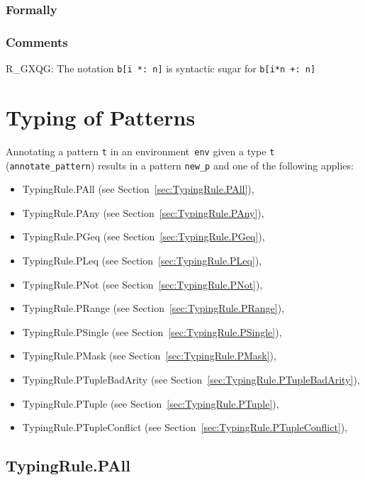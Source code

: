 \documentclass{book}
\begin{document}
\begin{emptyformal}
    \subsection{Formally}
\end{emptyformal}

\subsection{Comments}
    R\_GXQG: The notation \texttt{b[i *: n]} is syntactic sugar for \texttt{b[i*n +: n]}

\chapter{Typing of Patterns}

Annotating a pattern \texttt{t} in an environment~\texttt{env} given a type \texttt{t} (\texttt{annotate\_pattern}) results in a pattern \texttt{new\_p} and one of the following applies:
\begin{itemize}
\item TypingRule.PAll (see Section~\ref{sec:TypingRule.PAll}),
\item TypingRule.PAny (see Section~\ref{sec:TypingRule.PAny}),
\item TypingRule.PGeq (see Section~\ref{sec:TypingRule.PGeq}),
\item TypingRule.PLeq (see Section~\ref{sec:TypingRule.PLeq}),
\item TypingRule.PNot (see Section~\ref{sec:TypingRule.PNot}),
\item TypingRule.PRange (see Section~\ref{sec:TypingRule.PRange}),
\item TypingRule.PSingle (see Section~\ref{sec:TypingRule.PSingle}),
\item TypingRule.PMask (see Section~\ref{sec:TypingRule.PMask}),
\item TypingRule.PTupleBadArity (see Section~\ref{sec:TypingRule.PTupleBadArity}),
\item TypingRule.PTuple (see Section~\ref{sec:TypingRule.PTuple}),
\item TypingRule.PTupleConflict (see Section~\ref{sec:TypingRule.PTupleConflict}),
\end{itemize}

\section{TypingRule.PAll \label{sec:TypingRule.PAll}}
\end{document}
